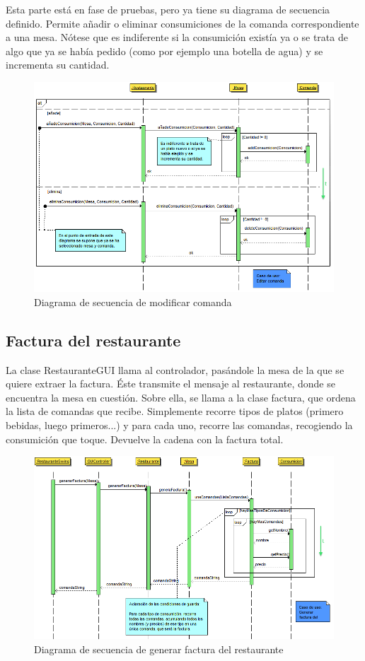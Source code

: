 \documentclass[spanish,a4paper,11pt, twoside]{report}	%
\begin{document}
		Esta parte está en fase de pruebas, pero ya tiene su diagrama de secuencia definido. Permite añadir o eliminar consumiciones de la comanda correspondiente a una mesa. Nótese que es indiferente si la consumición existía ya o se trata de algo que ya se había pedido (como por ejemplo una botella de agua) y se incrementa su cantidad.
		\begin{figure}[!h]
		\centering
		\includegraphics[scale=0.5]{DSmodificarcomanda.png}
		\caption{Diagrama de secuencia de modificar comanda}
		\end{figure}


		
		\subsection{Factura del restaurante}
		La clase RestauranteGUI llama al controlador, pasándole la mesa de la que se quiere extraer la factura. Éste transmite el mensaje al restaurante, donde se encuentra la mesa en cuestión. Sobre ella, se llama a la clase factura, que ordena la lista de comandas que recibe. Simplemente recorre tipos de platos (primero bebidas, luego primeros...) y para cada uno, recorre las comandas, recogiendo la consumición que toque. Devuelve la cadena con la factura total.
		\begin{figure}[!h]
		\centering
		\includegraphics[scale=0.5]{DSfactura.png}
		\caption{Diagrama de secuencia de generar factura del restaurante}
		\end{figure}
\end{document}

